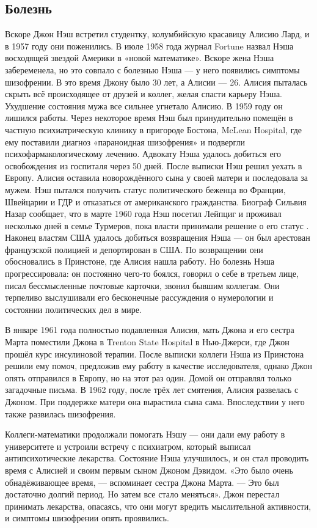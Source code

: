 \documentclass[12pt, a4paper]{article}
\begin{document}
\subsection{Болезнь}
Вскоре Джон Нэш встретил студентку, колумбийскую красавицу Алисию Лард, и в
1957 году они поженились. В июле 1958 года журнал Fortune назвал Нэша
восходящей звездой Америки в «новой математике». Вскоре жена Нэша забеременела,
но это совпало с болезнью Нэша — у него появились симптомы шизофрении. В это
время Джону было 30 лет, а Алисии — 26. Алисия пыталась скрыть всё происходящее
от друзей и коллег, желая спасти карьеру Нэша. Ухудшение состояния мужа все
сильнее угнетало Алисию. В 1959 году он лишился работы. Через некоторое время
Нэш был принудительно помещён в частную психиатрическую клинику в пригороде
Бостона, McLean Hospital, где ему поставили диагноз «параноидная шизофрения» и
подвергли психофармакологическому лечению. Адвокату Нэша удалось добиться его
освобождения из госпиталя через 50 дней. После выписки Нэш решил уехать в
Европу. Алисия оставила новорождённого сына у своей матери и последовала за
мужем. Нэш пытался получить статус политического беженца во Франции,
Швейцарии и ГДР и отказаться от американского гражданства. Биограф Сильвия
Назар сообщает, что в марте 1960 года Нэш посетил Лейпциг и проживал
несколько дней в семье Турмеров, пока власти принимали решение о его статус
. Наконец властям США удалось добиться возвращения Нэша — он был арестован
французской полицией и депортирован в США. По возвращении они обосновались
в Принстоне, где Алисия нашла работу. Но болезнь Нэша прогрессировала: он
постоянно чего-то боялся, говорил о себе в третьем лице, писал бессмысленные
почтовые карточки, звонил бывшим коллегам. Они терпеливо выслушивали его
бесконечные рассуждения о нумерологии и состоянии политических дел в мире.

В январе 1961 года полностью подавленная Алисия, мать Джона и его сестра Марта
поместили Джона в Trenton State Hospital в Нью-Джерси, где Джон прошёл курс
инсулиновой терапии. После выписки коллеги Нэша из Принстона решили ему помоч,
предложив ему работу в качестве исследователя, однако Джон опять
отправился в Европу, но на этот раз один. Домой он отправлял только загадочные
письма. В 1962 году, после трёх лет смятения, Алисия развелась с Джоном. При
поддержке матери она вырастила сына сама. Впоследствии у него также
развилась шизофрения.

Коллеги-математики продолжали помогать Нэшу — они дали ему работу в
университете и устроили встречу с психиатром, который выписал антипсихотические
лекарства. Состояние Нэша улучшилось, и он стал проводить время с Алисией и
своим первым сыном Джоном Дэвидом. «Это было очень обнадёживающее время, —
вспоминает сестра Джона Марта. — Это был достаточно долгий период. Но затем
все стало меняться». Джон перестал принимать лекарства, опасаясь, что они могут
вредить мыслительной активности, и симптомы шизофрении опять проявились.
\end{document}

